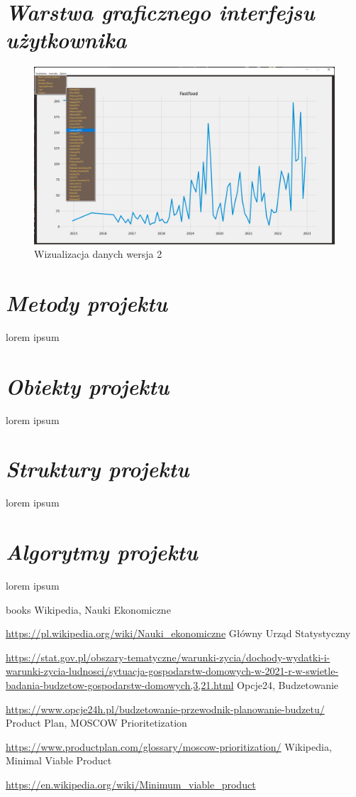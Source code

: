 \documentclass[a4paper,10pt]{report}
\newcommand{\customstylesection}[1]{\textbf{\textit{#1}}}
\begin{document}
\section{\customstylesection{Warstwa graficznego interfejsu użytkownika}}

\begin{figure}[H]           %
    \caption{Wizualizacja danych wersja 2}
    \label{fig:Wizualizacja danych wersja 2}
    \centering  
    \includegraphics[width=12cm]{figures/Interface_v0.2.png}
\end{figure}
\section{\customstylesection{Metody projektu}}
{lorem ipsum}

\section{\customstylesection{Obiekty projektu}}
{lorem ipsum}

\section{\customstylesection{Struktury projektu}}
{lorem ipsum}

\section{\customstylesection{Algorytmy projektu}}
{lorem ipsum}

\begin{thebibliography} {books}
 Wikipedia, Nauki Ekonomiczne \raggedright\url{
    https://pl.wikipedia.org/wiki/Nauki_ekonomiczne}
 Główny Urząd Statystyczny \raggedright\url{
    https://stat.gov.pl/obszary-tematyczne/warunki-zycia/dochody-wydatki-i-warunki-zycia-ludnosci/sytuacja-gospodarstw-domowych-w-2021-r-w-swietle-badania-budzetow-gospodarstw-domowych,3,21.html}
 Opcje24, Budzetowanie \raggedright\url{
    https://www.opcje24h.pl/budzetowanie-przewodnik-planowanie-budzetu/}
 Product Plan, MOSCOW Prioritetization \raggedright\url{
    https://www.productplan.com/glossary/moscow-prioritization/}
 Wikipedia, Minimal Viable Product \raggedright\url{
    https://en.wikipedia.org/wiki/Minimum_viable_product}
\end{thebibliography}

\listoffigures
\end{document}
